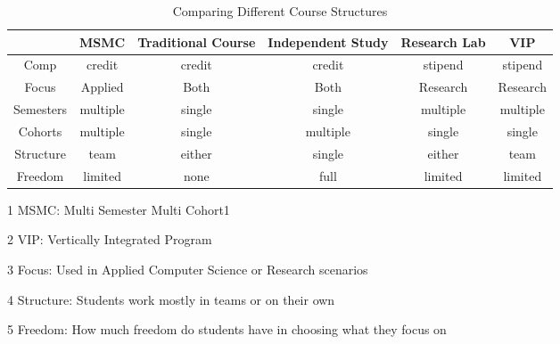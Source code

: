 \begin{table*}[h!]
    \begin{threeparttable}[b]
    \caption{Comparing Different Course Structures}
    	\begin{tabulary}
            {0.95\linewidth}{C|CCCCC} 
            \toprule
             & MSMC & Traditional Course & Independent Study & Research Lab & VIP \\
            \midrule
            Comp & credit & credit & credit & stipend & stipend \\
            Focus & Applied & Both & Both & Research & Research \\
            Semesters & multiple & single & single & multiple & multiple \\
            Cohorts & multiple & single & multiple & single & single \\
            Structure & team & either & single & either & team \\
            Freedom & limited & none & full & limited & limited \\
            \bottomrule
    	\end{tabulary}
    	\begin{tablenotes}
    	    \item [1] MSMC: Multi Semester Multi Cohort1
    	    \item [2] VIP: Vertically Integrated Program
    	    \item [3] Focus: Used in Applied Computer Science or Research scenarios
    	    \item [4] Structure: Students work mostly in teams or on their own
    	    \item [5] Freedom: How much freedom do students have in choosing what they focus on
    	\end{tablenotes}
      	\label{fig:summary}
  	\end{threeparttable}        
\end{table*}

